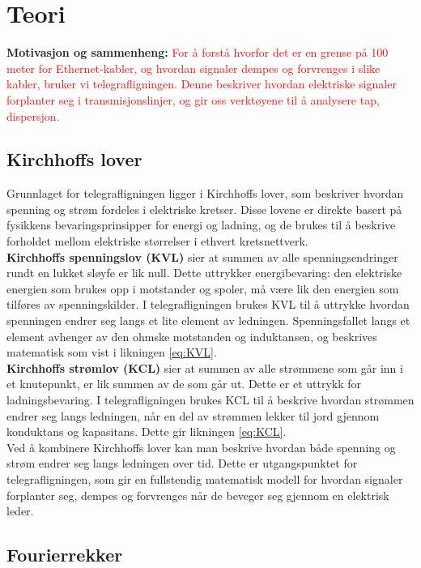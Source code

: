 
\section{Teori}

    \textbf{Motivasjon og sammenheng:} \textcolor{red}{For å forstå hvorfor det er en grense på 100 meter for Ethernet-kabler, og hvordan signaler dempes og forvrenges i slike kabler, bruker vi telegrafligningen. Denne beskriver hvordan elektriske signaler forplanter seg i transmisjonslinjer, og gir oss verktøyene til å analysere tap, dispersjon.}

\subsection{Kirchhoffs lover}

Grunnlaget for telegrafligningen ligger i Kirchhoffs lover, som beskriver hvordan spenning og strøm 
fordeles i elektriske kretser. Disse lovene er direkte basert på fysikkens bevaringsprinsipper 
for energi og ladning, og de brukes til å beskrive forholdet mellom elektriske størrelser i ethvert 
kretsnettverk.
\\[1em]
\textbf{Kirchhoffs spenningslov (KVL)} sier at summen av alle spenningsendringer rundt en lukket 
sløyfe er lik null. Dette uttrykker energibevaring: den elektriske energien som brukes opp i motstander 
og spoler, må være lik den energien som tilføres av spenningskilder. I telegrafligningen brukes KVL 
til å uttrykke hvordan spenningen endrer seg langs et lite element av ledningen. Spenningsfallet 
langs et element avhenger av den ohmske motstanden og induktansen, og beskrives matematisk som vist i likningen \eqref{eq:KVL}.
\\[1em]
\textbf{Kirchhoffs strømlov (KCL)} sier at summen av alle strømmene som går inn i et knutepunkt, 
er lik summen av de som går ut. Dette er et uttrykk for ladningsbevaring. I telegrafligningen brukes 
KCL til å beskrive hvordan strømmen endrer seg langs ledningen, når en del av strømmen lekker til jord 
gjennom konduktans og kapasitans. Dette gir likningen \eqref{eq:KCL}.\\[1em]
Ved å kombinere Kirchhoffs lover kan man beskrive hvordan både spenning og strøm endrer seg 
langs ledningen over tid. Dette er utgangspunktet for telegrafligningen, som gir 
en fullstendig matematisk modell for hvordan signaler forplanter seg, dempes og forvrenges når de beveger 
seg gjennom en elektrisk leder.

\subsection{Fourierrekker}


